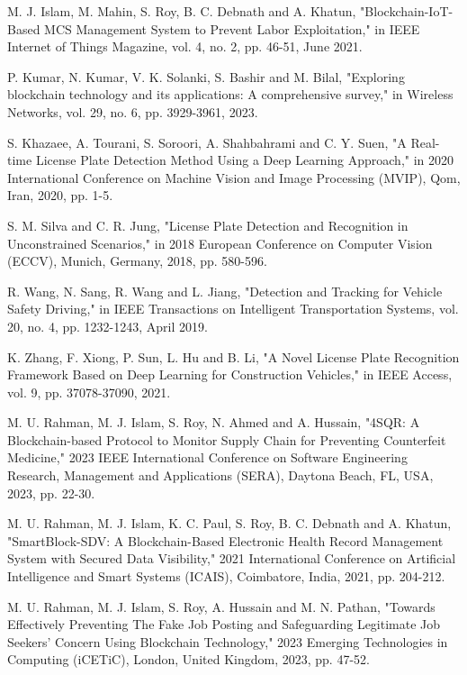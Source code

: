 \documentclass[conference]{IEEEtran}
\newcounter{Method}
\begin{document}
\begin{thebibliography}{00}
 M. J. Islam, M. Mahin, S. Roy, B. C. Debnath and A. Khatun, "Blockchain-IoT-Based MCS Management System to Prevent Labor Exploitation," in IEEE Internet of Things Magazine, vol. 4, no. 2, pp. 46-51, June 2021.

 P. Kumar, N. Kumar, V. K. Solanki, S. Bashir and M. Bilal, "Exploring blockchain technology and its applications: A comprehensive survey," in Wireless Networks, vol. 29, no. 6, pp. 3929-3961, 2023.

 S. Khazaee, A. Tourani, S. Soroori, A. Shahbahrami and C. Y. Suen, "A Real-time License Plate Detection Method Using a Deep Learning Approach," in 2020 International Conference on Machine Vision and Image Processing (MVIP), Qom, Iran, 2020, pp. 1-5.

 S. M. Silva and C. R. Jung, "License Plate Detection and Recognition in Unconstrained Scenarios," in 2018 European Conference on Computer Vision (ECCV), Munich, Germany, 2018, pp. 580-596.

 R. Wang, N. Sang, R. Wang and L. Jiang, "Detection and Tracking for Vehicle Safety Driving," in IEEE Transactions on Intelligent Transportation Systems, vol. 20, no. 4, pp. 1232-1243, April 2019.

 K. Zhang, F. Xiong, P. Sun, L. Hu and B. Li, "A Novel License Plate Recognition Framework Based on Deep Learning for Construction Vehicles," in IEEE Access, vol. 9, pp. 37078-37090, 2021.

 M. U. Rahman, M. J. Islam, S. Roy, N. Ahmed and A. Hussain, "4SQR: A Blockchain-based Protocol to Monitor Supply Chain for Preventing Counterfeit Medicine," 2023 IEEE International Conference on Software Engineering Research, Management and Applications (SERA), Daytona Beach, FL, USA, 2023, pp. 22-30.

 M. U. Rahman, M. J. Islam, K. C. Paul, S. Roy, B. C. Debnath and A. Khatun, "SmartBlock-SDV: A Blockchain-Based Electronic Health Record Management System with Secured Data Visibility," 2021 International Conference on Artificial Intelligence and Smart Systems (ICAIS), Coimbatore, India, 2021, pp. 204-212.

 M. U. Rahman, M. J. Islam, S. Roy, A. Hussain and M. N. Pathan, "Towards Effectively Preventing The Fake Job Posting and Safeguarding Legitimate Job Seekers' Concern Using Blockchain Technology," 2023 Emerging Technologies in Computing (iCETiC), London, United Kingdom, 2023, pp. 47-52.
\end{thebibliography}
\end{document}
